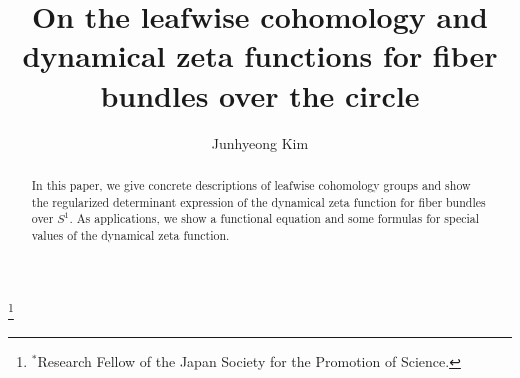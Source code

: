 \title{On the leafwise cohomology and dynamical zeta functions for fiber bundles over the circle}

\author{Junhyeong Kim}

\address{Graduate School of mathematics \endgraf 
Kyushu University  Motooka, Nishi-ku, \endgraf
Fukuoka 819-0395, Japan
}


\thanks{ 
$^*$Research Fellow of the Japan Society for the Promotion of Science.
}



\begin{abstract}
In this paper, we give concrete descriptions of leafwise cohomology groups and show the regularized determinant expression of the dynamical zeta function for fiber bundles over $S^{1}$.
As applications, we show a functional equation and some formulas for special values of the dynamical zeta function.
\end{abstract}

